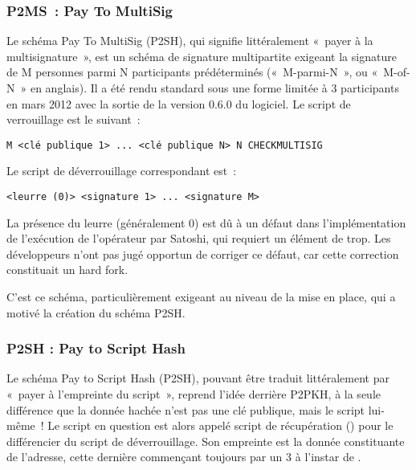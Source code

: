\subsubsection*{P2MS~: Pay To MultiSig} Le schéma Pay To MultiSig (P2SH), qui signifie littéralement «~payer à la multisignature~», est un schéma de signature multipartite exigeant la signature de M personnes parmi N participants prédéterminés («~M-parmi-N~», ou «~M-of-N~» en anglais). Il a été rendu standard sous une forme limitée à 3 participants en mars 2012 avec la sortie de la version 0.6.0 du logiciel. Le script de verrouillage est le suivant~:

\begin{Verbatim}[fontsize=\footnotesize]
M <clé publique 1> ... <clé publique N> N CHECKMULTISIG
\end{Verbatim}

Le script de déverrouillage correspondant est~:

\begin{Verbatim}[fontsize=\footnotesize]
<leurre (0)> <signature 1> ... <signature M>
\end{Verbatim}

La présence du leurre (généralement 0) est dû à un défaut dans l'implémentation de l'exécution de l'opérateur  par Satoshi, qui requiert un élément de trop. Les développeurs n'ont pas jugé opportun de corriger ce défaut, car cette correction constituait un hard fork.

C'est ce schéma, particulièrement exigeant au niveau de la mise en place, qui a motivé la création du schéma P2SH.

\subsubsection*{P2SH : Pay to Script Hash} Le schéma Pay to Script Hash (P2SH), pouvant être traduit littéralement par «~payer à l'empreinte du script~», reprend l'idée derrière P2PKH, à la seule différence que la donnée hachée n'est pas une clé publique, mais le script lui-même~! Le script en question est alors appelé script de récupération () pour le différencier du script de déverrouillage. Son empreinte est la donnée constituante de l'adresse, cette dernière commençant toujours par un 3 à l'instar de .

